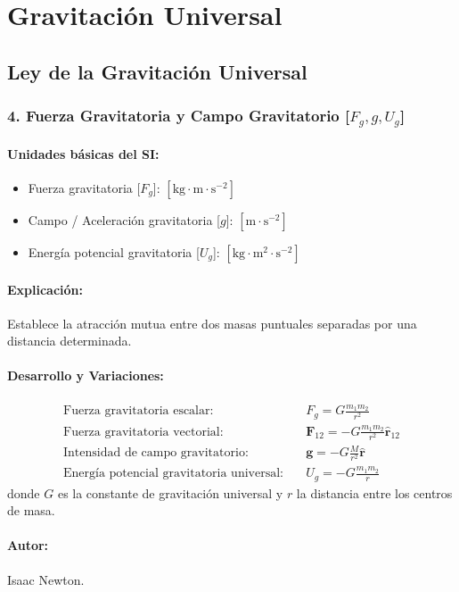 \documentclass[12pt,a4paper]{article}
\begin{document}
\section{Gravitación Universal}

\subsection{Ley de la Gravitación Universal}

\subsubsection*{4. Fuerza Gravitatoria y Campo Gravitatorio [$F_g, g, U_g$]}
\paragraph*{Unidades básicas del SI:}
\begin{itemize}
    \item Fuerza gravitatoria [$F_g$]: $[\text{kg}\cdot\text{m}\cdot\text{s}^{-2}]$
    \item Campo / Aceleración gravitatoria [$g$]: $[\text{m}\cdot\text{s}^{-2}]$
    \item Energía potencial gravitatoria [$U_g$]: $[\text{kg}\cdot\text{m}^2\cdot\text{s}^{-2}]$
\end{itemize}
\paragraph*{Explicación:} Establece la atracción mutua entre dos masas puntuales separadas por una distancia determinada.
\paragraph*{Desarrollo y Variaciones:}
\begin{align*}
\text{Fuerza gravitatoria escalar:} \quad & F_g = G \frac{m_1 m_2}{r^2} \\
\text{Fuerza gravitatoria vectorial:} \quad & \mathbf{F}_{12} = -G \frac{m_1 m_2}{r^2} \hat{\mathbf{r}}_{12} \\
\text{Intensidad de campo gravitatorio:} \quad & \mathbf{g} = -G \frac{M}{r^2} \hat{\mathbf{r}} \\
\text{Energía potencial gravitatoria universal:} \quad & U_g = -G \frac{m_1 m_2}{r}
\end{align*}
donde $G$ es la constante de gravitación universal y $r$ la distancia entre los centros de masa.
\paragraph*{Autor:} Isaac Newton.
\end{document}
